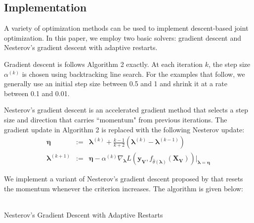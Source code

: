 \documentclass[10pt,letterpaper]{article}
\begin{document}
\subsection{Implementation}
A variety of optimization methods can be used to implement descent-based joint optimization. In this paper, we employ two basic solvers: gradient descent and Nesterov's gradient descent with adaptive restarts.

Gradient descent is follows Algorithm 2 exactly. At each iteration $k$, the step size $\alpha^{(k)}$ is chosen using backtracking line search. For the examples that follow, we generally use an initial step size between 0.5 and 1 and shrink it at a rate between 0.1 and 0.01.

Nesterov's gradient descent is an accelerated gradient method that selects a step size and direction that carries ``momentum" from previous iterations. The gradient update in Algorithm 2 is replaced with the following Nesterov update:
\begin{equation}
\begin{array}{lcl}
\boldsymbol{\eta} & := &
 \boldsymbol{\lambda}^{(k)} + \frac{k - 1}{k+2} \left( \boldsymbol{\lambda}^{(k)} - \boldsymbol{\lambda}^{(k-1)} \right ) \\
\boldsymbol{\lambda}^{(k+1)} & := &
\boldsymbol{\eta}
- \alpha^{(k)} \nabla_{\boldsymbol{\lambda}} L(\boldsymbol{y_V}, f_{\hat \theta(\boldsymbol{\lambda})}(\boldsymbol{X_V})) |_{\boldsymbol{\lambda} = \boldsymbol{\eta}} 
\end{array}
\label{nesterovUpdates}
\end{equation}

We implement a variant of Nesterov's gradient descent proposed by \citet{o2013adaptive} that resets the momentum whenever the criterion increases. The algorithm is given below:
\begin{center}
  \\
  Nesterov's Gradient Descent with Adaptive Restarts
\end{center}
\end{document}
